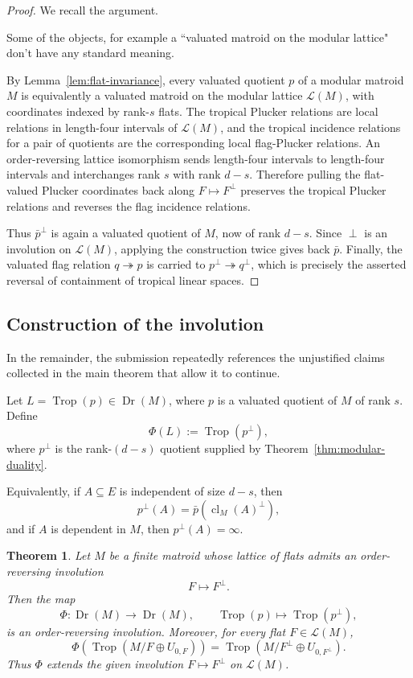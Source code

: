 \documentclass[12pt]{article}
\newcommand{\Trop}{\operatorname{Trop}}
\newcommand{\Dr}{\operatorname{Dr}}
\newcommand{\cl}{\operatorname{cl}}
\newcommand{\cL}{\mathcal L}
\theoremstyle{plain}
\newtheorem{theorem}{Theorem}[section]
\theoremstyle{definition}
\newcommand{\review}[1]{\begin{reviewbox}#1\end{reviewbox}}
\begin{document}
\begin{proof}
We recall the argument.
\review{Some of the objects, for example a ``valuated matroid on the modular lattice" don't have any standard meaning.}
By Lemma~\ref{lem:flat-invariance}, every valuated quotient \(p\) of a modular matroid \(M\) is equivalently a valuated matroid on the modular lattice \(\cL(M)\), with coordinates indexed by rank-\(s\) flats.  The tropical Plucker relations are local relations in length-four intervals of \(\cL(M)\), and the tropical incidence relations for a pair of quotients are the corresponding local flag-Plucker relations.  An order-reversing lattice isomorphism sends length-four intervals to length-four intervals and interchanges rank \(s\) with rank \(d-s\).  Therefore pulling the flat-valued Plucker coordinates back along \(F\mapsto F^\perp\) preserves the tropical Plucker relations and reverses the flag incidence relations.

Thus \(\bar p^\perp\) is again a valuated quotient of \(M\), now of rank \(d-s\).  Since \(\perp\) is an involution on \(\cL(M)\), applying the construction twice gives back \(\bar p\).  Finally, the valuated flag relation \(q\twoheadrightarrow p\) is carried to \(p^\perp\twoheadrightarrow q^\perp\), which is precisely the asserted reversal of containment of tropical linear spaces.
\end{proof}

\subsection{Construction of the involution}

\review{In the remainder, the submission repeatedly references the unjustified claims collected in the main theorem that allow it to continue.}

Let \(L=\Trop(p)\in \Dr(M)\), where \(p\) is a valuated quotient of \(M\) of rank \(s\).  Define
\[
   \Phi(L):=\Trop(p^\perp),
\]
where \(p^\perp\) is the rank-\((d-s)\) quotient supplied by Theorem~\ref{thm:modular-duality}.

Equivalently, if \(A\subseteq E\) is independent of size \(d-s\), then
\[
   p^\perp(A)=\bar p(\cl_M(A)^\perp),
\]
and if \(A\) is dependent in \(M\), then \(p^\perp(A)=\infty\).

\begin{theorem}\label{thm:main}
Let \(M\) be a finite matroid whose lattice of flats admits an order-reversing involution
\[
   F\longmapsto F^\perp.
\]
Then the map
\[
   \Phi:\Dr(M)\longrightarrow \Dr(M),\qquad
   \Trop(p)\longmapsto \Trop(p^\perp),
\]
is an order-reversing involution.  Moreover, for every flat \(F\in \cL(M)\),
\[
   \Phi\!\left(\Trop(M/F\oplus U_{0,F})\right)
   =
   \Trop(M/F^\perp\oplus U_{0,F^\perp}).
\]
Thus \(\Phi\) extends the given involution \(F\mapsto F^\perp\) on \(\cL(M)\).
\end{theorem}
\end{document}
